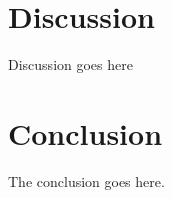 \documentclass[journal]{IEEEtran}
\begin{document}
%



\section{Discussion}
Discussion goes here

\section{Conclusion}
The conclusion goes here.





\end{document}
